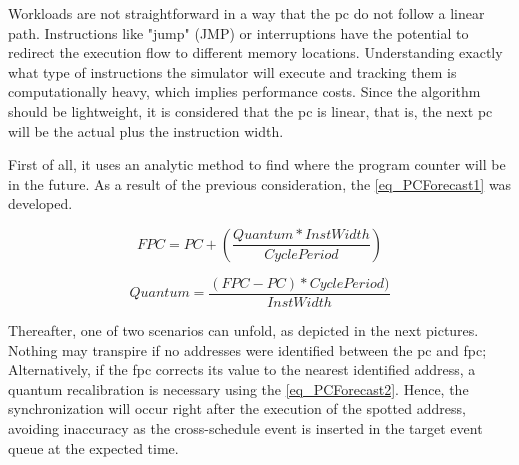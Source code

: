 Workloads are not straightforward in a way that the \gls{pc} do not follow a linear path. Instructions like "jump" (JMP) or interruptions 
have the potential to redirect the execution flow to different memory locations. Understanding exactly what type of instructions the simulator 
will execute and tracking them is computationally heavy, which implies performance costs. Since the algorithm should be lightweight, it is considered 
that the \gls{pc} is linear, that is, the next \gls{pc} will be the actual plus the instruction width. 

First of all, it uses an analytic method to find where the program counter will be in the future. As a result of the previous consideration, 
the \autoref{eq_PCForecast1} was developed.

\begin{equation}
    FPC = PC + \left( \frac{Quantum * InstWidth}{CyclePeriod} \right)
    \label{eq_PCForecast1}
\end{equation}

\begin{equation}
    Quantum = \frac{  \left( FPC - PC \right) * CyclePeriod)}{InstWidth} 
    \label{eq_PCForecast2}
\end{equation}

\hspace*{1cm}

Thereafter, one of two scenarios can unfold, as depicted in the next pictures. Nothing may transpire if no addresses were 
identified between the \gls{pc} and \gls{fpc}; Alternatively, if the \gls{fpc} corrects its value to the nearest identified 
address, a quantum recalibration is necessary using the \autoref{eq_PCForecast2}. Hence, the synchronization will occur right after the 
execution of the spotted address, avoiding inaccuracy as the cross-schedule event is inserted in the target event queue at the expected time.

